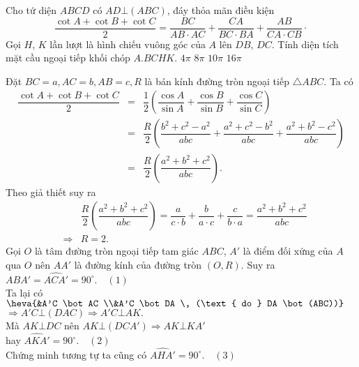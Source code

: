 \begin{ex}%
Cho tứ diện $ ABCD $ có $ AD \bot (ABC) $, đáy thỏa mãn điều kiện $$\dfrac{\cot A + \cot B + \cot C}{2} = \dfrac{BC}{AB \cdot AC} + \dfrac{CA}{BC \cdot BA} + \dfrac{AB}{CA \cdot CB
} \cdot$$
Gọi $ H $, $ K $ lần lượt là hình chiếu vuông góc của $ A $ lên $ DB $, $ DC $. Tính diện tích mặt cầu ngoại tiếp khối chóp $ A.BCHK. $
	\choice
	{$ 4 \pi $}
	{$ 8 \pi $}
	{$ 10 \pi $}
	{\True $ 16 \pi  $}
	\loigiai
	{Đặt $BC = a, AC = b, AB = c, R $ là bán kính đường tròn ngoại tiếp $ \triangle ABC. $
Ta có \begin{eqnarray*}
\dfrac{\cot A + \cot B + \cot C}{2} &=& \dfrac{1}{2}\left(\dfrac{\cos A}{\sin A}+\dfrac{\cos B}{\sin B}+\dfrac{\cos C}{\sin C} \right)\\
& = & \dfrac{R}{2} \left(\dfrac{b^2+c^2-a^2}{abc} + \dfrac{a^2+c^2-b^2}{abc} + \dfrac{a^2+b^2-c^2}{abc}\right) \\
&=& \dfrac{R}{2}\left(\dfrac{a^2+b^2+c^2}{abc}\right).
\end{eqnarray*}	
Theo giả thiết suy ra 
\begin{eqnarray*}
&&\dfrac{R}{2} \left(\dfrac{a^2+b^2+c^2}{abc}\right) = \dfrac{a}{c \cdot b} + \dfrac{b}{a \cdot c} + \dfrac{c}{b \cdot a} = \dfrac{a^2+b^2+c^2}{abc} \\
	&\Rightarrow& R = 2.
\end{eqnarray*}	
\immini
{
	Gọi $ O $ là tâm đường tròn ngoại tiếp tam giác $ ABC $, $ A'  $ là điểm đối xứng của $ A  $ qua $ O $ nên $ AA' $ là đường kính của đường tròn $ (O,R) $. Suy ra $ \widehat{ABA'} =  \widehat{ACA'} = 90^\circ. \quad (1)$\\
	Ta lại có $ \heva{&A'C \bot AC \\&A'C \bot DA \, (\text{ do } DA \bot (ABC))}$ $\Rightarrow A'C \bot (DAC) \Rightarrow A'C \bot AK. $ \\
	Mà $ AK \bot DC  $ nên $ AK \bot (DCA') \Rightarrow AK \bot KA' $\\ hay $ \widehat{AKA'} = 90^\circ. \quad (2)$\\
	Chứng minh tương tự ta cũng có $\widehat{AHA'} = 90^\circ. \quad (3) $\\
}
{
}}
\end{ex}
